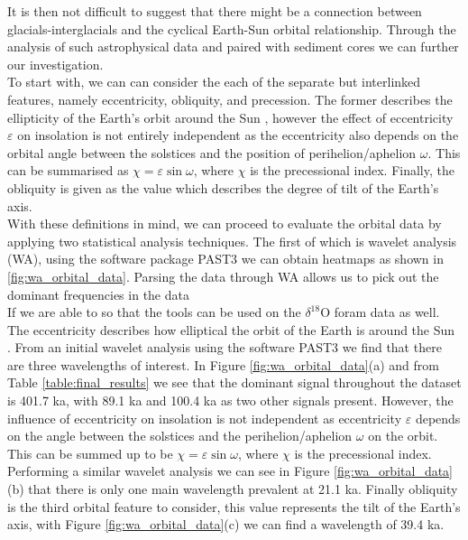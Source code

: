 \documentclass[12pt, onecolumn]{revtex4}    %
\begin{document}

It is then not difficult to suggest that there might be a connection between glacials-interglacials and the cyclical Earth-Sun orbital relationship. Through the analysis of such astrophysical data and paired with sediment cores we can further our investigation. \\

To start with, we can can consider the each of the separate but interlinked features, namely eccentricity, obliquity, and precession. The former describes the ellipticity of the Earth's orbit around the Sun \cite{carroll_astro}, however the effect of eccentricity $\varepsilon$ on insolation is not entirely independent as the eccentricity also depends on the orbital angle between the solstices and the position of perihelion/aphelion $\omega$. This can be summarised as $\chi= \varepsilon \sin{\omega}$, where $\chi$ is the precessional index. Finally, the obliquity is given as the value which describes the degree of tilt of the Earth's axis. \\

With these definitions in mind, we can proceed to evaluate the orbital data by applying two statistical analysis techniques. The first of which is wavelet analysis (WA), using the software package PAST3 \cite{past3} we can obtain heatmaps as shown in \ref{fig:wa_orbital_data}. Parsing the data through WA allows us to pick out the dominant frequencies in the data \\

If we are able to so that the tools can be used on the $\delta^{18}$O foram data as well. \\

The eccentricity describes how elliptical the orbit of the Earth is around the Sun \cite{carroll_astro}. From an initial wavelet analysis using the software PAST3 \cite{past3} we find that there are three wavelengths of interest. In Figure \ref{fig:wa_orbital_data}(a) and from Table \ref{table:final_results} we see that the dominant signal throughout the dataset is 401.7 ka, with 89.1 ka and 100.4 ka as two other signals present. However, the influence of eccentricity on insolation is not independent as eccentricity $\varepsilon$ depends on the angle between the solstices and the perihelion/aphelion $\omega$ on the orbit. This can be summed up to be $\chi= \varepsilon \sin{\omega}$, where $\chi$ is the precessional index. Performing a similar wavelet analysis we can see in Figure \ref{fig:wa_orbital_data}(b) that there is only one main wavelength prevalent at 21.1 ka. Finally obliquity is the third orbital feature to consider, this value represents the tilt of the Earth's axis, with Figure \ref{fig:wa_orbital_data}(c) we can find a wavelength of 39.4 ka. \\ 
\end{document}
